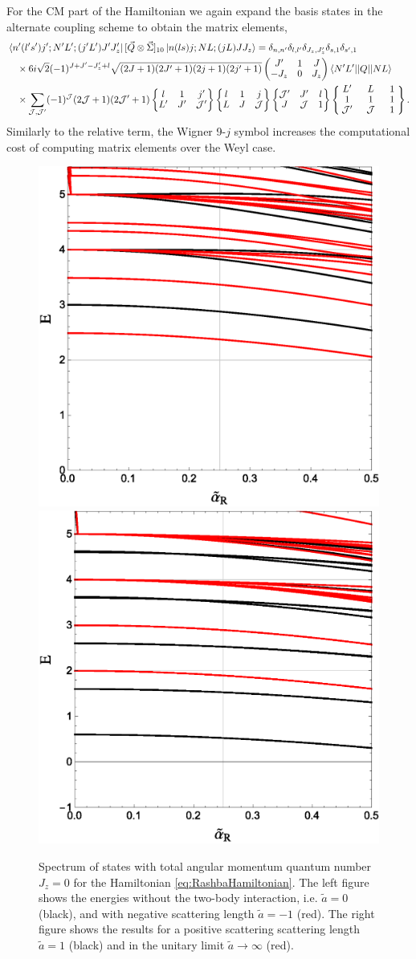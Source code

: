 \documentclass[%
 preprint,
 amsmath,amssymb,
 aps,
]{revtex4-1}
\newcommand{\threej}[6]{ \begin{pmatrix}
  #1 & #2 & #3 \\
  #4 & #5 & #6 
 \end{pmatrix}}
\newcommand{\sixj}[6]{ \begin{Bmatrix}
  #1 & #2 & #3 \\
  #4 & #5 & #6 
 \end{Bmatrix}}
\newcommand{\ninej}[9]{ \begin{Bmatrix}
  #1 & #2 & #3 \\
  #4 & #5 & #6 \\
  #7 & #8 & #9
 \end{Bmatrix}}
\begin{document}
For the CM part of the Hamiltonian we again expand the basis states in the alternate coupling scheme to obtain the matrix elements,
\begin{equation}\begin{split}
&\bra{n'(l's')j';N'L';(j'L')J'J'_z} [ \vec{Q} \otimes \vec{\Sigma} ]_{10}  \ket{n(ls)j;NL;(jL)JJ_z} = \delta_{n,n'}\delta_{l,l'}\delta_{J_z,J'_z}\delta_{s,1}\delta_{s',1} \\
 &\quad\times 6 i \sqrt{2}(-1)^{J+J'-J'_z+l} \sqrt{(2J+1)(2J'+1)(2j+1)(2j'+1)} \threej{J'}{1}{J}{-J_z}{0}{J_z}  \braket{N' L' || Q || N L} \\ 
 &\quad\times\sum_{\mathcal{J},\mathcal{J}'} (-1)^\mathcal{J}(2\mathcal{J}+1)(2\mathcal{J}'+1)\sixj{l}{1}{j'}{L'}{J'}{\mathcal{J}'}\sixj{l}{1}{j}{L}{J}{\mathcal{J}}\sixj{\mathcal{J}'}{J'}{l}{J}{\mathcal{J}}{1}
 \renewcommand{\arraystretch}{0.9}
 \ninej{\hphantom{l}L'\hphantom{l}}{\hphantom{l}L\hphantom{l}}{\hphantom{l}1\hphantom{l}}{1}{1}{1}{\mathcal{J}'}{\mathcal{J}}{1} .
\end{split}
\end{equation}
Similarly to the relative term, the Wigner 9-$j$ symbol increases the computational cost of computing matrix elements over the Weyl case.

\begin{figure}
\includegraphics[width=0.5\linewidth]{Figures/Rashbaa0am1}\nobreak
\includegraphics[width=0.5\linewidth]{Figures/Rashbaa1aInf}
\caption{\label{fig:RashbaSpectrum} Spectrum of states with total angular momentum quantum number $J_z=0$ for the Hamiltonian \eqref{eq:RashbaHamiltonian}. The left figure shows the energies without the two-body interaction, i.e. $\tilde{a}=0$ (black), and with negative scattering length $\tilde{a}=-1$ (red). The right figure shows the results for a positive scattering scattering length $\tilde{a}=1$ (black) and in the unitary limit $\tilde{a}\rightarrow\infty$ (red).} 
\end{figure}
\end{document}

